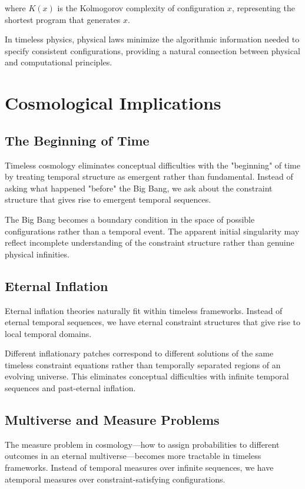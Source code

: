 \documentclass[12pt]{article}
\begin{document}
where $K(x)$ is the Kolmogorov complexity of configuration $x$, representing the shortest program that generates $x$.

In timeless physics, physical laws minimize the algorithmic information needed to specify consistent configurations, providing a natural connection between physical and computational principles.

\section{Cosmological Implications}

\subsection{The Beginning of Time}

Timeless cosmology eliminates conceptual difficulties with the "beginning" of time by treating temporal structure as emergent rather than fundamental. Instead of asking what happened "before" the Big Bang, we ask about the constraint structure that gives rise to emergent temporal sequences.

The Big Bang becomes a boundary condition in the space of possible configurations rather than a temporal event. The apparent initial singularity may reflect incomplete understanding of the constraint structure rather than genuine physical infinities.

\subsection{Eternal Inflation}

Eternal inflation theories naturally fit within timeless frameworks. Instead of eternal temporal sequences, we have eternal constraint structures that give rise to local temporal domains.

Different inflationary patches correspond to different solutions of the same timeless constraint equations rather than temporally separated regions of an evolving universe. This eliminates conceptual difficulties with infinite temporal sequences and past-eternal inflation.

\subsection{Multiverse and Measure Problems}

The measure problem in cosmology—how to assign probabilities to different outcomes in an eternal multiverse—becomes more tractable in timeless frameworks. Instead of temporal measures over infinite sequences, we have atemporal measures over constraint-satisfying configurations.
\end{document}
